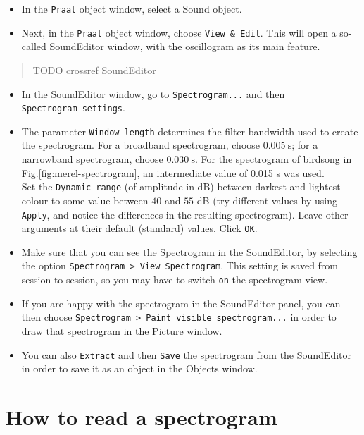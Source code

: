 \documentclass[
]{book}
\begin{document}
\begin{itemize}
\item
  In the \texttt{Praat} object window, select a Sound object.
\item
  Next, in the \texttt{Praat} object window, choose \texttt{View\ \&\ Edit}. This will open a so-called SoundEditor window, with the oscillogram as its main feature.
\end{itemize}

\begin{quote}
TODO crossref SoundEditor
\end{quote}

\begin{itemize}
\item
  In the SoundEditor window, go to \texttt{Spectrogram...} and then \texttt{Spectrogram\ settings}.
\item
  The parameter \texttt{Window\ length} determines the filter bandwidth used to create the spectrogram. For a broadband spectrogram, choose \(0.005\ \textrm{s}\); for a narrowband spectrogram, choose \(0.030\ \textrm{s}\).
  For the spectrogram of birdsong in Fig.\ref{fig:merel-spectrogram}, an intermediate value of 0.015 s was used.\\
  Set the \texttt{Dynamic\ range} (of amplitude in dB) between darkest and lightest colour to some value between \(40\) and \(55\) dB (try different values by using \texttt{Apply}, and notice the differences in the resulting spectrogram).
  Leave other arguments at their default (standard) values. Click \texttt{OK}.
\item
  Make sure that you can see the Spectrogram in the SoundEditor, by selecting the option \texttt{Spectrogram\ \textgreater{}\ View\ Spectrogram}. This setting is saved from session to session, so you may have to switch \texttt{on} the spectrogram view.
\item
  If you are happy with the spectrogram in the SoundEditor panel, you can then choose \texttt{Spectrogram\ \textgreater{}\ Paint\ visible\ spectrogram...} in order to draw that spectrogram in the Picture window.
\item
  You can also \texttt{Extract} and then \texttt{Save} the spectrogram from the SoundEditor in order to save it as an object in the Objects window.
\end{itemize}

\section{How to read a spectrogram}\label{sec:readspectrogram}
\end{document}
